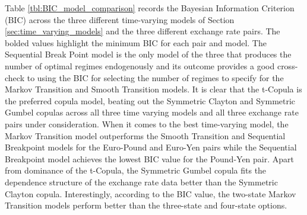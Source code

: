 \documentclass[12pt]{article}
\begin{document}
Table \ref{tbl:BIC_model_comparison} records the Bayesian Information Criterion (BIC) across the three different time-varying models of Section \ref{sec:time_varying_models} and the three different exchange rate pairs. The bolded values highlight the minimum BIC for each pair and model. The Sequential Break Point model is the only model of the three that produces the number of optimal regimes endogenously and its outcome provides a good cross-check to using the BIC for selecting the number of regimes to specify for the Markov Transition and Smooth Transition models. It is clear that the t-Copula is the preferred copula model, beating out the Symmetric Clayton and Symmetric Gumbel copulas across all three time varying models and all three exchange rate pairs under consideration. When it comes to the best time-varying model, the Markov Transition model outperforms the Smooth Transition and Sequential Breakpoint models for the Euro-Pound and Euro-Yen pairs while the Sequential Breakpoint model achieves the lowest BIC value for the Pound-Yen pair. Apart from dominance of the t-Copula, the Symmetric Gumbel copula fits the dependence structure of the exchange rate data better than the Symmetric Clayton copula. Interestingly, according to the BIC value, the two-state Markov Transition models perform better than the three-state and four-state options.
\end{document}
